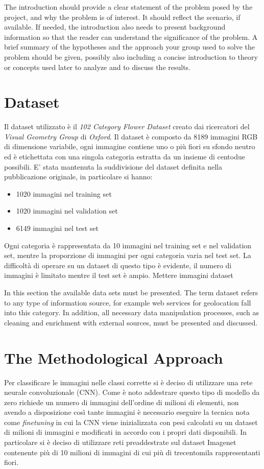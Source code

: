 The introduction should provide a clear statement of the problem posed by the project, and why the problem is of interest. It should reflect the scenario, if available. If needed, the introduction also needs to present background information so that the reader can understand the significance of the problem. A brief summary of the hypotheses and the approach your group used to solve the problem should be given, possibly also including a concise introduction to theory or concepts used later to analyze and to discuss the results.


\section{Dataset}
Il dataset utilizzato è il \textit{102 Category Flower Dataset} creato dai ricercatori del \textit{Visual Geometry Group} di \textit{Oxford}. Il dataset è composto da 8189 immagini RGB di dimensione variabile, ogni immagine contiene uno o più fiori su sfondo neutro ed è etichettata con una singola categoria estratta da un insieme di centodue possibili. 
E' stata mantenuta la suddivisione del dataset definita nella pubblicazione originale, in particolare si hanno:
\begin{itemize}
\item 1020 immagini nel training set
\item 1020 immagini nel validation set
\item 6149 immagini nel test set
\end{itemize}
Ogni categoria è rappresentata da 10 immagini nel training set e nel validation set, mentre la proporzione di immagini per ogni categoria varia nel test set.
La difficoltà di operare su un dataset di questo tipo è evidente, il numero di immagini è limitato mentre il test set è ampio.
Mettere immagini dataset

In this section the available data sets must be presented. The term dataset refers to any type of information source, for example web services for geolocation fall into this category. 
In addition, all necessary data manipulation processes, such as cleaning and enrichment with external sources, must be presented and discussed.

\section{The Methodological Approach}
Per classificare le immagini nelle classi corrette si è deciso di utilizzare una rete neurale convoluzionale (CNN). Come è noto addestrare questo tipo di modello da zero richiede un numero di immagini dell'ordine di milioni di elementi, non avendo a disposizione così tante immagini è necessario eseguire la tecnica nota come \textit{finetuning} in cui la CNN viene inizializzata con pesi calcolati su un dataset di milioni di immagini e modificati in accordo con i propri dati disponibili.
In particolare si è deciso di utilizzare reti preaddestrate sul dataset Imagenet contenente più di 10 milioni di immagini di cui più di trecentomila rappresentanti fiori.
